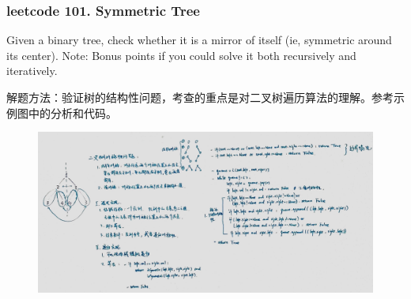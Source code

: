 \documentclass[a4paper,10pt]{article}
\begin{document}
\subsubsection{leetcode 101. Symmetric Tree}
Given a binary tree, check whether it is a mirror of itself (ie, symmetric around its center). Note: Bonus points if you could solve it both recursively and iteratively.\\

\begin{CJK*}{UTF8}{gbsn}
\noindent 解题方法：验证树的结构性问题，考查的重点是对二叉树遍历算法的理解。参考示例图中的分析和代码。
\end{CJK*}

\begin{figure}[h]
    \includegraphics[width=\textwidth]{leetcode101.jpg}
    \centering \\
\end{figure}
\end{document}
